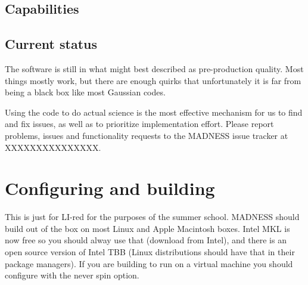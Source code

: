 \documentclass[letterpaper]{book}
\begin{document}
\section{Capabilities}



\section{Current status}

The software is still in what might best described as pre-production
quality.  Most things mostly work, but there are enough quirks that
unfortunately it is far from being a black box like most Gaussian
codes.

Using the code to do actual science is the most effective mechanism
for us to find and fix issues, as well as to prioritize implementation
effort.  Please report problems, issues and functionality requests to the
MADNESS issue tracker at XXXXXXXXXXXXXXX.

\chapter{Configuring and building}

This is just for LI-red for the purposes of the summer school.
MADNESS should build out of the box on most Linux and Apple Macintosh
boxes. Intel MKL is now free so you should alway use that (download
from Intel), and there is an open source version of Intel TBB (Linux
distributions should have that in their package managers).  If you are
building to run on a virtual machine you should configure with the
never spin option.
\end{document}
